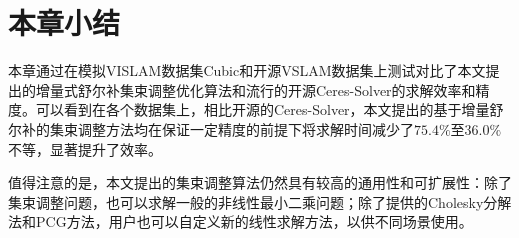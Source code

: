 \section{本章小结}

本章通过在模拟VISLAM数据集Cubic和开源VSLAM数据集上测试对比了本文提出的增量式舒尔补集束调整优化算法和流行的开源Ceres-Solver的求解效率和精度。可以看到在各个数据集上，相比开源的Ceres-Solver，本文提出的基于增量舒尔补的集束调整方法均在保证一定精度的前提下将求解时间减少了$75.4\%$至$36.0\%$不等，显著提升了效率。

值得注意的是，本文提出的集束调整算法仍然具有较高的通用性和可扩展性：除了集束调整问题，也可以求解一般的非线性最小二乘问题；除了提供的Cholesky分解法和PCG方法，用户也可以自定义新的线性求解方法，以供不同场景使用。
